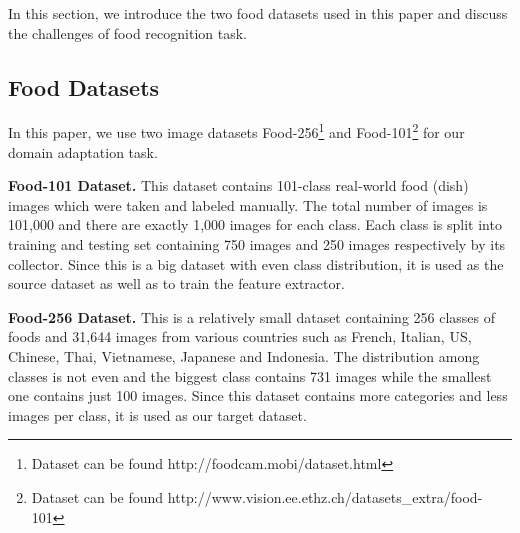 In this section, we introduce the two food datasets used in this paper and discuss the challenges of food recognition task.
\subsection{Food Datasets}
 In this paper, we use two image datasets Food-256\footnote{Dataset can be found http://foodcam.mobi/dataset.html} \cite{kawano14c} and Food-101\footnote{Dataset can be found http://www.vision.ee.ethz.ch/datasets\_extra/food-101} \cite{bossard14} for our domain adaptation task.

\textbf{Food-101 Dataset.}
This dataset contains 101-class real-world food (dish) images which were taken and labeled manually. The total number of images is 101,000 and there are exactly 1,000 images for each class. Each class is split into training and testing set containing 750 images and 250 images respectively by its collector. Since this is a big dataset with even class distribution, it is used as the source dataset as well as to train the feature extractor.

\textbf{Food-256 Dataset.}
This is a relatively small dataset containing 256 classes of foods and 31,644 images from various countries such as French, Italian, US, Chinese, Thai, Vietnamese, Japanese and Indonesia. The distribution among classes is not even and the biggest class contains 731 images while the smallest one contains just 100 images. Since this dataset contains more categories and less images per class, it is used as our target dataset.

